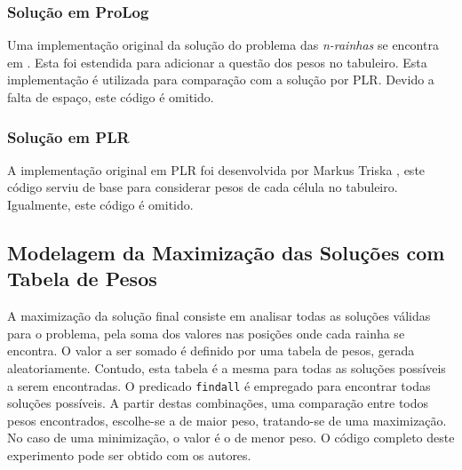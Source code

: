 \documentclass[12pt]{article}
\newenvironment{code}
{\begin{list}{}
{\setlength{\leftmargin}{1.5cm}
\setlength{\rightmargin}{1.5cm}
\lstset{float = {H},
lineskip = -1pt,
captionpos = b,
numbers = left,
numberstyle = \tiny,
basicstyle = \scriptsize,
tabsize = 4}}
\item\scriptsize}
{\end{list}}
\newcommand{\nrainhas}{\emph{n-rainhas }}
\theoremstyle{definition}
\begin{document}
\subsubsection{Solução em ProLog}

Uma  implementação original da solução do problema das \nrainhas 
se encontra em \cite{bratko2001}. Esta foi estendida para adicionar a questão dos pesos 
no tabuleiro. Esta implementação 
é utilizada para comparação com a solução por PLR. 
Devido a falta de espaço, este código é omitido.


\subsubsection{Solução em PLR}

A implementação original em PLR foi desenvolvida por Markus Triska \cite{Triska}, este
código serviu de base para  considerar pesos de cada célula no tabuleiro. Igualmente,
este código é omitido.



\subsection{Modelagem da Maximização das Soluções com Tabela de Pesos}

 A maximização da solução final consiste em analisar 
 todas as soluções válidas para o problema,
 pela soma dos valores nas posições onde cada rainha 
 se encontra. O valor a ser somado é definido por uma 
 tabela de pesos, gerada aleatoriamente. 
 Contudo, esta tabela é a mesma para todas as soluções possíveis a serem encontradas.
 O predicado \texttt{findall} é empregado para 
 encontrar todas soluções possíveis. A partir destas 
 combinações, uma comparação entre todos pesos encontrados, 
 escolhe-se a de maior peso, tratando-se de uma maximização. No caso de uma minimização, 
 o valor é o de menor peso. O código completo deste experimento
  pode ser obtido com os autores.
\end{document}
